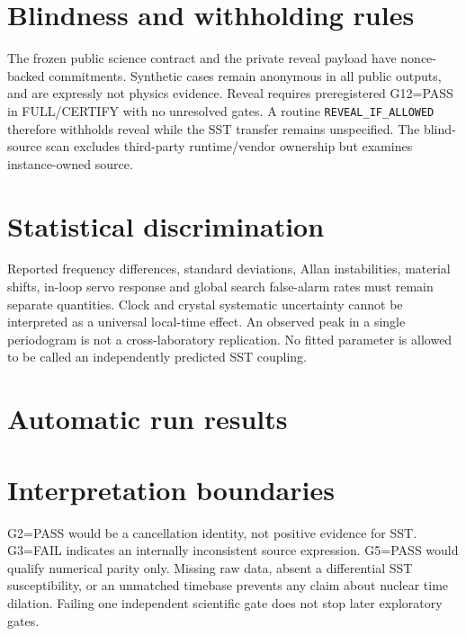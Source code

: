 \documentclass[11pt,a4paper]{article}
\begin{document}
\section{Blindness and withholding rules}
The frozen public science contract and the private reveal payload have nonce-backed commitments. Synthetic cases remain anonymous in all public outputs, and are expressly not physics evidence. Reveal requires preregistered G12=PASS in FULL/CERTIFY with no unresolved gates. A routine \texttt{REVEAL\_IF\_ALLOWED} therefore withholds reveal while the SST transfer remains unspecified. The blind-source scan excludes third-party runtime/vendor ownership but examines instance-owned source.
\section{Statistical discrimination}
Reported frequency differences, standard deviations, Allan instabilities, material shifts, in-loop servo response and global search false-alarm rates must remain separate quantities. Clock and crystal systematic uncertainty cannot be interpreted as a universal local-time effect. An observed peak in a single periodogram is not a cross-laboratory replication. No fitted parameter is allowed to be called an independently predicted SST coupling.
\section{Automatic run results}
\section{Interpretation boundaries}
G2=PASS would be a cancellation identity, not positive evidence for SST. G3=FAIL indicates an internally inconsistent source expression. G5=PASS would qualify numerical parity only. Missing raw data, absent a differential SST susceptibility, or an unmatched timebase prevents any claim about nuclear time dilation. Failing one independent scientific gate does not stop later exploratory gates.
\end{document}
